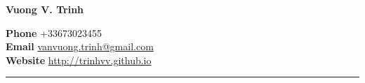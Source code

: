 \documentclass[a4paper,11pt]{article}
\newcommand\tab[1][1cm]{\hspace*{#1}}
\begin{document}
{\hspace*{-\marginparsep minus \marginparwidth} 
\begin{minipage}[t]{\textwidth+\marginparwidth+\marginparsep} 
{\LARGE \bfseries {Vuong V. Trinh}} 

\vspace{0.2cm} 
\textbf{Phone} \tab[0.75cm] {\color{darkblue} +33673023455} \\
\textbf{Email} \tab[0.75cm] \href{mailto:vanvuong.trinh@gmail.com}{vanvuong.trinh@gmail.com} \\
\textbf{Website} \tab[0.435cm]  \href{https://trinhvv.github.io}{http://trinhvv.github.io} \\
\vspace{-0.6cm}

\rule{\columnwidth}{1pt}
\end{minipage}}

\vspace{0.5cm}
\end{document}
